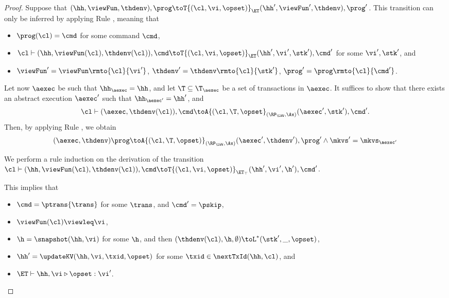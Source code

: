 \begin{proof}
Suppose that $(\hh, \viewFun, \thdenv), \prog \toT{(\cl, \vi, \opset)}_{\ET} (\hh', \viewFun', \thdenv), \prog'$. 
This transition can only be inferred by applying Rule , meaning that 
\begin{itemize}
\item $\prog(\cl) = \cmd$ for some command $\cmd$, 
\item $\cl \vdash (\hh, \viewFun(\cl), \thdenv(\cl)), \cmd \toT{(\cl, \vi, \opset)}_{\ET} (\hh', \vi', \stk'), \cmd'$ 
for some $\vi', \stk'$, and 
\item $\viewFun' = \viewFun\rmto{\cl}{\vi'}$, $\thdenv' = \thdenv\rmto{\cl}{\stk'}$, $\prog' = \prog\rmto{\cl}{\cmd'}$. 
\end{itemize}
Let now $\aexec$ be such that $\hh_{\aexec} = \hh$, and let $\T \subseteq \T_{\aexec}$ be a set of 
transactions in $\aexec$. It suffices to show that there exists an abstract execution $\aexec'$ such that 
$\hh_{\aexec'} = \hh'$, and 
\[
\cl \vdash (\aexec, \thdenv(\cl)), \cmd \toA{(\cl, \T , \opset}_{(\RP_{\LWW}, \Ax)} (\aexec', \stk'), \cmd'.
\]
Then, by applying Rule , we obtain 
\[ 
    (\aexec, \thdenv) \prog \toA{(\cl, \T, \opset)}_{(\RP_{\LWW}, \Ax)} (\aexec' ,\thdenv'), \prog' \land \mkvs' = \mkvs_{\aexec'}
\]

We perform a rule induction on the derivation of the transition $\cl \vdash (\hh, \viewFun(\cl), \thdenv(\cl)), \cmd \toT{(\cl, \vi, \opset)}_{\ET_{\top}} (\hh', \vi', \h'), \cmd'$. 

This implies that 
\begin{itemize}
\item $\cmd = \ptrans{\trans}$ for some $\trans$, and $\cmd' = \pskip$,
\item $\viewFun(\cl) \viewleq \vi$, 
\item $\h = \snapshot(\hh, \vi)$ for some \( \h \), and then $(\thdenv(\cl), \h, \emptyset) \toL^{\ast} (\stk', \_, \opset)$, 
\item $\hh' = \updateKV(\hh, \vi, \txid, \opset)$ for some $\txid \in \nextTxId(\hh, \cl)$, and
\item $\ET \vdash \hh, \vi \triangleright \opset: \vi'$.
\end{itemize}


\end{proof}
